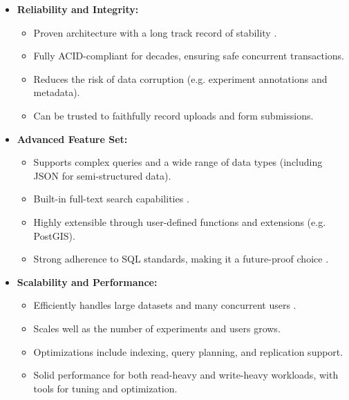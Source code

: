 \begin{itemize} 
	\item \textbf{Reliability and Integrity:} 
	\begin{itemize}
		\item Proven architecture with a long track record of stability \parencite{PostgresAbout}. 
		\item Fully ACID-compliant for decades, ensuring safe concurrent transactions. 
		\item Reduces the risk of data corruption (e.g. experiment annotations and metadata). 
		\item Can be trusted to faithfully record uploads and form submissions. 
	\end{itemize}
	
	\item \textbf{Advanced Feature Set:} 
	\begin{itemize}
		\item Supports complex queries and a wide range of data types (including JSON for semi-structured data). 
		\item Built-in full-text search capabilities \parencite{PostgresJSON,PostgresFTS}. 
		\item Highly extensible through user-defined functions and extensions (e.g. PostGIS). 
		\item Strong adherence to SQL standards, making it a future-proof choice \parencite{PostgresAbout}. 
	\end{itemize}
	
	\item \textbf{Scalability and Performance:} 
	\begin{itemize}
		\item Efficiently handles large datasets and many concurrent users \parencite{PostgresAbout}. 
		\item Scales well as the number of experiments and users grows. 
		\item Optimizations include indexing, query planning, and replication support. 
		\item Solid performance for both read-heavy and write-heavy workloads, with tools for tuning and optimization. 
	\end{itemize}
	

\end{itemize}
